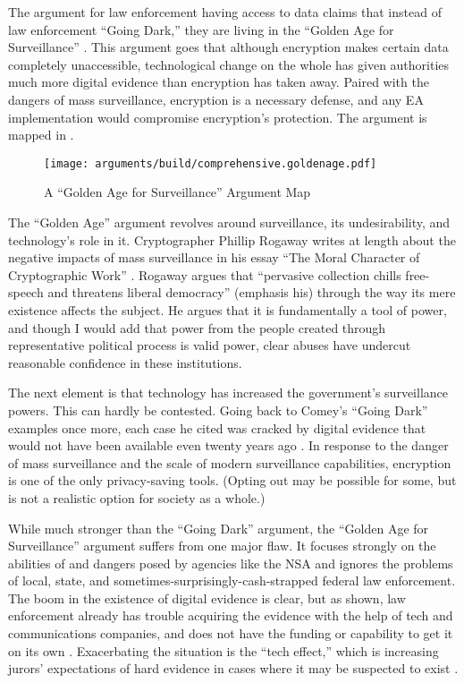 
The argument for law enforcement having  access to data claims that instead of law enforcement ``Going
Dark,'' they are living in the ``Golden Age for Surveillance'' \cite{swire_encryption_2011}. This argument goes that
although encryption makes certain data completely unaccessible, technological change on the whole has given authorities
much more digital evidence than encryption has taken away. Paired with the dangers of mass surveillance, encryption is
a necessary defense, and any \ac{EA} implementation would compromise encryption's protection. The argument is mapped in
.

\begin{figure}[h]
  \centering\CaptionFontSize
  \texttt{[image: arguments/build/comprehensive.goldenage.pdf]}
  \caption{A ``Golden Age for Surveillance'' Argument Map}
  \label{fig-arg-golden-age}
\end{figure}

The ``Golden Age'' argument revolves around surveillance, its undesirability, and technology's role in it. Cryptographer
Phillip Rogaway writes at length about the negative impacts of mass surveillance in his essay ``The Moral Character of
Cryptographic Work'' \cite{rogaway_moral_2015}. Rogaway argues that ``pervasive collection  chills
free-speech and threatens liberal democracy'' (emphasis his) through the way its mere existence affects the subject. He
argues that it is fundamentally a tool of power, and though I would add that power from the people created through
representative political process is valid power, clear abuses have undercut reasonable confidence in these institutions.

The next element is that technology has increased the government's surveillance powers. This can hardly be contested.
Going back to Comey's ``Going Dark'' examples once more, each case he cited was cracked by digital evidence that would
not have been available even twenty years ago \cite{comey_2014}. In response to the danger of mass surveillance and the
scale of modern surveillance capabilities, encryption is one of the only privacy-saving tools. (Opting out may be
possible for some, but is not a realistic option for society as a whole.)

While much stronger than the ``Going Dark'' argument, the ``Golden Age for Surveillance'' argument suffers from one
major flaw. It focuses strongly on the abilities of and dangers posed by agencies like the \ac{NSA} and ignores the
problems of local, state, and sometimes-surprisingly-cash-strapped federal law enforcement. The boom in the existence of
digital evidence is clear, but as shown, law enforcement already has trouble acquiring the evidence with the help of
tech and communications companies, and does not have the funding or capability to get it on its own \cite{carter_2018}.
Exacerbating the situation is the ``tech effect,'' which is increasing jurors' expectations of hard evidence in cases
where it may be suspected to exist \cite{shelton_study_2006}.

